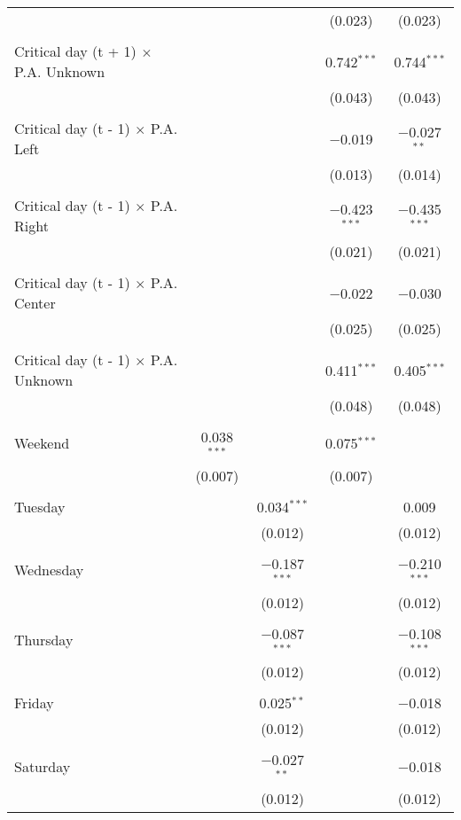 \documentclass[
]{article}
\begin{document}
\begin{table}[!htbp]
{\begin{tabular}{@{\extracolsep{5pt}}lcccc}
  &  &  & (0.023) & (0.023) \\ 
  & & & & \\ 
 Critical day (t + 1) $\times$ P.A. Unknown &  &  & 0.742$^{***}$ & 0.744$^{***}$ \\ 
  &  &  & (0.043) & (0.043) \\ 
  & & & & \\ 
 Critical day (t - 1) $\times$ P.A. Left &  &  & $-$0.019 & $-$0.027$^{**}$ \\ 
  &  &  & (0.013) & (0.014) \\ 
  & & & & \\ 
 Critical day (t - 1) $\times$ P.A. Right &  &  & $-$0.423$^{***}$ & $-$0.435$^{***}$ \\ 
  &  &  & (0.021) & (0.021) \\ 
  & & & & \\ 
 Critical day (t - 1) $\times$ P.A. Center &  &  & $-$0.022 & $-$0.030 \\ 
  &  &  & (0.025) & (0.025) \\ 
  & & & & \\ 
 Critical day (t - 1) $\times$ P.A. Unknown &  &  & 0.411$^{***}$ & 0.405$^{***}$ \\ 
  &  &  & (0.048) & (0.048) \\ 
  & & & & \\ 
 Weekend & 0.038$^{***}$ &  & 0.075$^{***}$ &  \\ 
  & (0.007) &  & (0.007) &  \\ 
  & & & & \\ 
 Tuesday &  & 0.034$^{***}$ &  & 0.009 \\ 
  &  & (0.012) &  & (0.012) \\ 
  & & & & \\ 
 Wednesday &  & $-$0.187$^{***}$ &  & $-$0.210$^{***}$ \\ 
  &  & (0.012) &  & (0.012) \\ 
  & & & & \\ 
 Thursday &  & $-$0.087$^{***}$ &  & $-$0.108$^{***}$ \\ 
  &  & (0.012) &  & (0.012) \\ 
  & & & & \\ 
 Friday &  & 0.025$^{**}$ &  & $-$0.018 \\ 
  &  & (0.012) &  & (0.012) \\ 
  & & & & \\ 
 Saturday &  & $-$0.027$^{**}$ &  & $-$0.018 \\ 
  &  & (0.012) &  & (0.012) \\ 

\end{tabular}}
\end{table}
\end{document}
